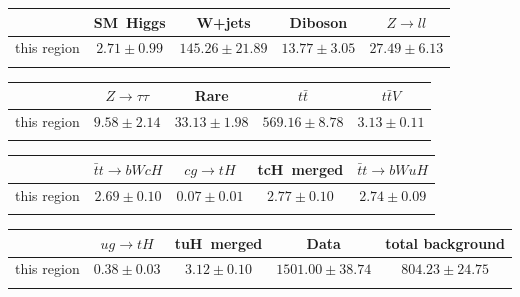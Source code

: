 \centering
\begin{tabular}{ccccc} \toprule\toprule
 & SM~Higgs & W+jets & Diboson & $Z\to ll$\\\midrule
this region & $2.71\pm0.99$ & $145.26\pm21.89$ & $13.77\pm3.05$ & $27.49\pm6.13$\\
\bottomrule\bottomrule\\
\end{tabular}
\begin{tabular}{ccccc} \toprule\toprule
 & $Z\to \tau\tau$ & Rare & $t\bar{t}$ & $t\bar{t}V$\\\midrule
this region & $9.58\pm2.14$ & $33.13\pm1.98$ & $569.16\pm8.78$ & $3.13\pm0.11$\\
\bottomrule\bottomrule\\
\end{tabular}
\begin{tabular}{ccccc} \toprule\toprule
 & $\bar{t}t\to bWcH$ & $cg\to tH$ & tcH~merged & $\bar{t}t\to bWuH$\\\midrule
this region & $2.69\pm0.10$ & $0.07\pm0.01$ & $2.77\pm0.10$ & $2.74\pm0.09$\\
\bottomrule\bottomrule\\
\end{tabular}
\begin{tabular}{ccccc} \toprule\toprule
 & $ug\to tH$ & tuH~merged & Data & total background\\\midrule
this region & $0.38\pm0.03$ & $3.12\pm0.10$ & $1501.00\pm38.74$ & $804.23\pm24.75$\\
\bottomrule\bottomrule\\
\end{tabular}
